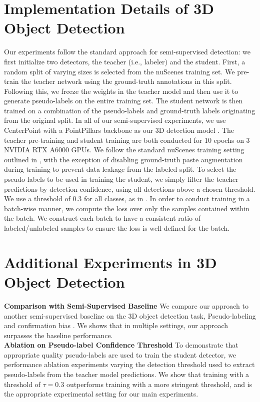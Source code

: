 \section{Implementation Details of 3D Object Detection}
Our experiments follow the standard approach for semi-supervised detection: we first initialize two detectors, the teacher (i.e., labeler) and the student. First, a random split of varying sizes is selected from the nuScenes training set. We pre-train the teacher network using the ground-truth annotations in this split. Following this, we freeze the weights in the teacher model and then use it to generate pseudo-labels on the entire training set. The student network is then trained on a combination of the pseudo-labels and ground-truth labels originating from the original split. In all of our semi-supervised experiments, we use CenterPoint with a PointPillars backbone as our 3D detection model \citep{yin2021center,Lang2019PointPillarsFE}. The teacher pre-training and student training are both conducted for 10 epochs on 3 NVIDIA RTX A6000 GPUs. We follow the standard nuScenes training setting outlined in \cite{zhu2019class}, with the exception of disabling ground-truth paste augmentation during training to prevent data leakage from the labeled split. To select the pseudo-labels to be used in training the student, we simply filter the teacher predictions by detection confidence, using all detections above a chosen threshold. We use a threshold of 0.3 for all classes, as in \cite{park2022detmatch}. In order to conduct training in a batch-wise manner, we compute the loss over only the samples contained within the batch. We construct each batch to have a consistent ratio of labeled/unlabeled samples to ensure the loss is well-defined for the batch. 

\section{Additional Experiments in 3D Object Detection}

\textbf{Comparison with Semi-Supervised Baseline} We compare our approach to another semi-supervised baseline on the 3D object detection task, Pseudo-labeling and confirmation bias \cite{pseudoLabel2019}. We shows that in multiple settings, our approach surpasses the baseline performance.\\
\textbf{Ablation on Pseudo-label Confidence Threshold} To demonstrate that appropriate quality pseudo-labels are used to train the student detector, we performance ablation experiments varying the detection threshold used to extract pseudo-labels from the teacher model predictions. We show that training with a  threshold of $\tau=0.3$ outperforms training with a more stringent threshold, and is the appropriate experimental setting for our main experiments. 

